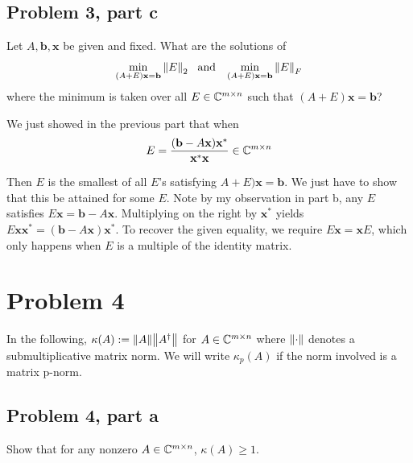 \subsection{Problem 3, part c}
Let $A, \textbf{b}, \textbf{x}$ be given and fixed. What are the solutions of 
\[
    \min_{(A+E)\textbf{x} = \textbf{b}} \norm{E}_2 \hspace{3mm} \text{and} \hspace{3mm} \min_{(A+E)\textbf{x} = \textbf{b}} \norm{E}_F
\]
where the minimum is taken over all $E \in \mathbb{C}^{m\times n}$ such that $(A+E)\textbf{x} = \textbf{b}$?
\partbreak
\begin{solution}

We just showed in the previous part that when 
\[
    E = \frac{(\textbf{b} - A\textbf{x})\textbf{x}^*}{\textbf{x}^*\textbf{x}} \in \mathbb{C}^{m\times n}
\] 

 Then $E$ is the smallest of all $E$'s satisfying $A+E)\textbf{x} = \textbf{b}$. We just have to show that this be attained for some $E$. Note by my observation in part b, any $E$ satisfies $E\textbf{x} = \textbf{b} - A\textbf{x}$. Multiplying on the right by $\textbf{x}^*$ yields $E\textbf{x}\textbf{x}^* = (\textbf{b} - A\textbf{x})\textbf{x}^*$. To recover the given equality, we require $E\textbf{x} = \textbf{x}E$, which only happens when $E$ is a multiple of the identity matrix. 
\end{solution}

\newpage
\section{Problem 4}
In the following, $\kappa(A) := \norm{A}\norm{A^\dag}$ for $A\in \mathbb{C}^{m\times n}$ where $\norm{\cdot}$ denotes a submultiplicative matrix norm. We will write $\kappa_p(A)$ if the norm involved is a matrix p-norm. 

\subsection{Problem 4, part a}
Show that for any nonzero $A \in \mathbb{C}^{m\times n}$, $\kappa(A) \geq 1$.

